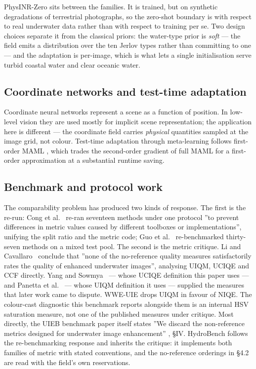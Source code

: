 \documentclass[journal]{IEEEtran}
\begin{document}
PhysINR-Zero sits between the families. It is trained, but on synthetic degradations of terrestrial photographs, so the zero-shot boundary is with respect to real underwater data rather than with respect to training per se. Two design choices separate it from the classical priors: the water-type prior is \emph{soft} --- the field emits a distribution over the ten Jerlov types rather than committing to one --- and the adaptation is per-image, which is what lets a single initialisation serve turbid coastal water and clear oceanic water.

\subsection{Coordinate networks and test-time adaptation}
Coordinate neural networks represent a scene as a function of position. In low-level vision they are used mostly for implicit scene representation; the application here is different --- the coordinate field carries \emph{physical} quantities sampled at the image grid, not colour. Test-time adaptation through meta-learning follows first-order MAML \cite{finn2017maml}, which trades the second-order gradient of full MAML for a first-order approximation at a substantial runtime saving.

\subsection{Benchmark and protocol work}
The comparability problem has produced two kinds of response. The first is the re-run: Cong et al.~\cite{cong2024survey} re-ran seventeen methods under one protocol ''to prevent differences in metric values caused by different toolboxes or implementations'', unifying the split ratio and the metric code; Guo et al.~\cite{guo2025guidedhyb} re-benchmarked thirty-seven methods on a mixed test pool. The second is the metric critique. Li and Cavallaro~\cite{li2022limits} conclude that ''none of the no-reference quality measures satisfactorily rates the quality of enhanced underwater images'', analysing UIQM, UCIQE and CCF directly. Yang and Sowmya~\cite{yang2015uciqe} --- whose UCIQE definition this paper uses --- and Panetta et al.~\cite{panetta2016uiqm} --- whose UIQM definition it uses --- supplied the measures that later work came to dispute. WWE-UIE \cite{cheng2026wweuie} drops UIQM in favour of NIQE. The colour-cast diagnostic this benchmark reports alongside them is an internal HSV saturation measure, not one of the published measures under critique. Most directly, the UIEB benchmark paper itself states ''We discard the non-reference metrics designed for underwater image enhancement'' \cite{li2020uieb} , \S{}IV. HydroBench follows the re-benchmarking response and inherits the critique: it implements both families of metric with stated conventions, and the no-reference orderings in \S{}4.2 are read with the field's own reservations.
\end{document}
